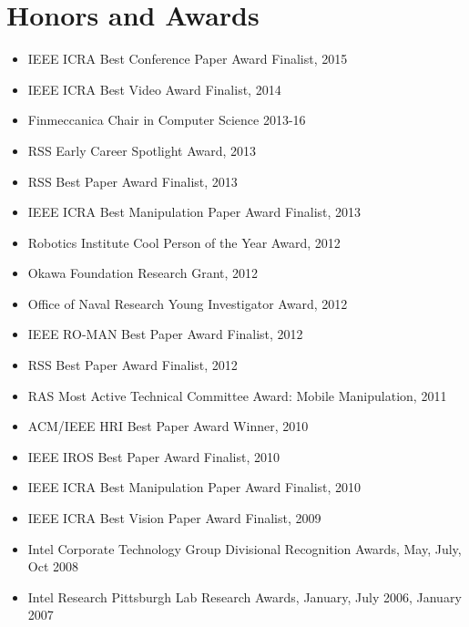 \documentclass[10pt]{article}
\begin{document}
\section{Honors and Awards}
\begin{itemize}
\addtolength{\itemsep}{-0.5\baselineskip}
\item IEEE ICRA Best Conference Paper Award Finalist, 2015
\item IEEE ICRA Best Video Award Finalist, 2014
\item Finmeccanica Chair in Computer Science 2013-16
\item RSS Early Career Spotlight Award, 2013
\item RSS Best Paper Award Finalist, 2013
\item IEEE ICRA Best Manipulation Paper Award Finalist, 2013
\item Robotics Institute Cool Person of the Year Award, 2012
\item Okawa Foundation Research Grant, 2012
\item Office of Naval Research Young Investigator Award, 2012
\item IEEE RO-MAN Best Paper Award Finalist, 2012
\item RSS Best Paper Award Finalist, 2012
\item RAS Most Active Technical Committee Award: Mobile Manipulation, 2011 
\item ACM/IEEE HRI Best Paper Award Winner, 2010
\item IEEE IROS Best Paper Award Finalist, 2010
\item IEEE ICRA Best Manipulation Paper Award Finalist, 2010
\item IEEE ICRA Best Vision Paper Award Finalist, 2009
\item Intel Corporate Technology Group Divisional Recognition Awards, May, July, Oct 2008
\item Intel Research Pittsburgh Lab Research Awards, January, July 2006, January 2007
\end{itemize}
\newpage
\end{document}
